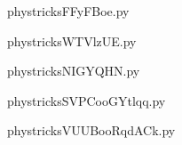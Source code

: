     

    \clearpage
    


    \newcommand{\CaptionFigFFyFBoe}{<+Type your caption here+>}
    \begin{center}
        
    \end{center}
    phystricksFFyFBoe.py

    

    \clearpage
    


    \newcommand{\CaptionFigWTVlzUE}{<+Type your caption here+>}
    \begin{center}
        
    \end{center}
    phystricksWTVlzUE.py

    

    \clearpage
    


    \newcommand{\CaptionFigNIGYQHN}{<+Type your caption here+>}
    \begin{center}
        
    \end{center}
    phystricksNIGYQHN.py

    

    \clearpage
    


    \newcommand{\CaptionFigSVPCooGYtlqq}{<+Type your caption here+>}
    \begin{center}
        
    \end{center}
    phystricksSVPCooGYtlqq.py

    

    \clearpage
    


    \newcommand{\CaptionFigVUUBooRqdACk}{<+Type your caption here+>}
    \begin{center}
        
    \end{center}
    phystricksVUUBooRqdACk.py

    

    \clearpage
    


